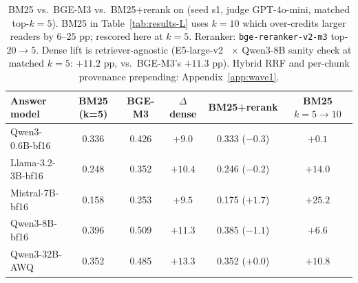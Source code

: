 \begin{table}[h]
\centering
\small
\caption{BM25 vs.\ BGE-M3 vs.\ BM25$+$rerank on \benchL (seed s1, judge GPT-4o-mini, matched top-$k{=}5$). BM25 in Table~\ref{tab:results-L} uses $k{=}10$ which over-credits larger readers by $6$--$25$ pp; rescored here at $k{=}5$. Reranker: \texttt{bge-reranker-v2-m3} top-$20\!\to\!5$. Dense lift is retriever-agnostic (E5-large-v2~\citep{wang2022e5} $\times$ Qwen3-8B sanity check at matched $k{=}5$: $+11.2$ pp, vs.\ BGE-M3's $+11.3$ pp). Hybrid RRF and per-chunk provenance prepending: Appendix~\ref{app:wave1}.}
\label{tab:p1c-rag}
\begin{tabular}{lccccc}
\toprule
Answer model         & BM25 (k=5) & BGE-M3 & $\Delta$ dense & BM25+rerank & BM25 $k{=}5{\to}10$ \\
\midrule
Qwen3-0.6B-bf16      & 0.336 & 0.426 & $+9.0$  & 0.333 ($-0.3$) & $+0.1$  \\
Llama-3.2-3B-bf16    & 0.248 & 0.352 & $+10.4$ & 0.246 ($-0.2$) & $+14.0$ \\
Mistral-7B-bf16      & 0.158 & 0.253 & $+9.5$  & 0.175 ($+1.7$) & $+25.2$ \\
Qwen3-8B-bf16        & 0.396 & 0.509 & $+11.3$ & 0.385 ($-1.1$) & $+6.6$  \\
Qwen3-32B-AWQ        & 0.352 & 0.485 & $+13.3$ & 0.352 ($+0.0$) & $+10.8$ \\
\bottomrule
\end{tabular}
\end{table}
